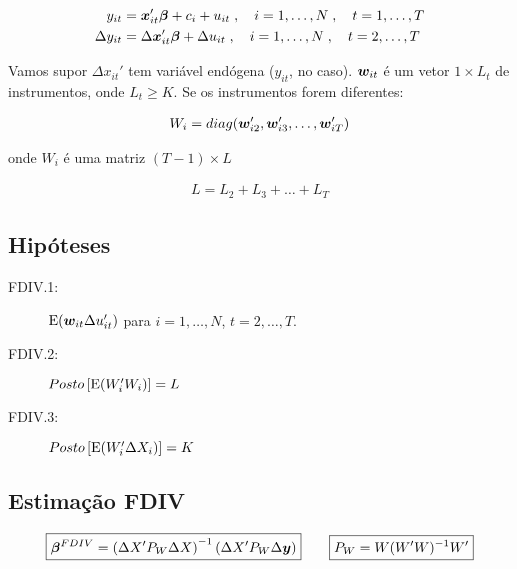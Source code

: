 \documentclass[11pt, oneside, a4paper, article]{article}
\numberwithin{equation}{section}
\begin{document}
\begin{description}
	\vspace{-1 em}
	\begin{align*}
		y_{it} &= \boldsymbol{x}_{it}' \boldsymbol{\beta} + c_{i} + u_{it}
		\; , \quad i = 1, \dots, N
		\; , \quad t = 1, \dots, T
		\\
		\Delta y_{it} &= \Delta \boldsymbol{x}_{it}' \boldsymbol{\beta} + \Delta u_{it}
		\; , \quad i = 1, \dots, N
		\; , \quad t = 2, \dots, T
	\end{align*}

	Vamos supor $\Delta x_{it}'$ tem variável endógena ($y_{it}$, no caso).
	$\boldsymbol{w}_{it}$ é um vetor $1 \times L_{t}$ de instrumentos, onde $L_{t} \geq K$.
	Se os instrumentos forem diferentes:

	\vspace{-1 em}
	\begin{align*}
		W_{i} = diag( \boldsymbol{w}_{i2}', \boldsymbol{w}_{i3}', \dots, \boldsymbol{w}_{iT}')
	\end{align*}

	\noindent
	onde $W_{i}$ é uma matriz $( T - 1 ) \times L$

	\vspace{-1 em}
	\begin{align*}
		L = L_{2} + L_{3} + \dots + L_{T}
	\end{align*}

	\subsection{Hipóteses}

	\begin{description}
		\item[FDIV.1:] $\text{E}( \boldsymbol{w}_{it} \Delta u_{it}')$ para $i = 1, \dots, N$, $t = 2, \dots, T$.
		\item[FDIV.2:] $Posto\left[ \text{E}( W_{i}' W_{i} ) \right] = L$
		\item[FDIV.3:] $Posto\left[ \text{E}( W_{i}' \Delta X_{i} ) \right] = K$
	\end{description}

	\subsection{Estimação FDIV}

	\vspace{-1 em}
	\begin{align*}
		\boxed{
			\boldsymbol{\beta}^{FDIV} =  
			\left(
				\Delta X' P_{W} \Delta X 
			\right)^{-1}
			\left(
				\Delta X' P_{W} \Delta \boldsymbol{y}
			\right)
		}
		\qquad
		\boxed{
		P_{W} = W(W'W)^{-1}W'}
	\end{align*}


\end{description}
\end{document}
